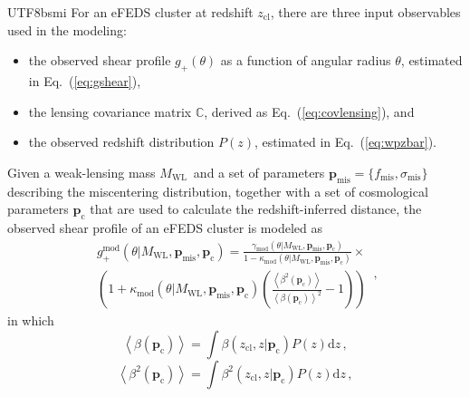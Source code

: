 \documentclass[longauth]{aa}
\newcommand{\redshift}{\ensuremath{z}}
\newcommand{\dif}{\ensuremath{\mathrm{d}}}
\newcommand{\zcl}{\ensuremath{z_{\mathrm{cl}}}}
\newcommand{\gshear}{\ensuremath{g_{+}}}
\newcommand{\Mwl}{\ensuremath{M_{\mathrm{WL}}}}
\newcommand{\lensingeff}{\ensuremath{\beta}}
\newcommand{\fmis}{\ensuremath{f_{\mathrm{mis}}}}
\newcommand{\sigmamis}{\ensuremath{{\sigma}_{\mathrm{mis}}}}
\begin{document}
\begin{CJK*}{UTF8}{bsmi}
For an eFEDS cluster at redshift \zcl, there are three input observables used in the modeling: 
%
\begin{itemize}
\item the observed shear profile ${\gshear}\left(\theta\right)$ as a function of angular radius $\theta$, estimated in Eq.~(\ref{eq:gshear}),
\item the lensing covariance matrix $\mathbb{C}$, derived as Eq.~(\ref{eq:covlensing}), and
\item the observed redshift distribution $P\left(\redshift\right)$, estimated in Eq.~(\ref{eq:wpzbar}).
\end{itemize}
%
Given a weak-lensing mass \Mwl\ and a set of parameters 
$\mathbf{p}_{\mathrm{mis}}=\{\fmis, \sigmamis\}$
describing the miscentering distribution, together with a set of cosmological parameters 
$\mathbf{p}_{\mathrm{c}}$
that are used to calculate the redshift-inferred distance, the observed shear profile of an eFEDS cluster is modeled as \citep{seitz97}
%
\begin{equation}
\label{eq:lensingmodel}
\begin{aligned}
g_{+}^{\mathrm{mod}}\left(
\theta |\Mwl, \mathbf{p}_{\mathrm{mis}}, \mathbf{p}_{\mathrm{c}}
\right) = 
\frac{
{\gamma}_{\mathrm{mod}}\left(
\theta |\Mwl, \mathbf{p}_{\mathrm{mis}}, \mathbf{p}_{\mathrm{c}}
\right)
}{
1 - {\kappa}_{\mathrm{mod}}\left(
\theta |\Mwl, \mathbf{p}_{\mathrm{mis}}, \mathbf{p}_{\mathrm{c}}
\right)
}\times
\\
\left(
1 + {\kappa}_{\mathrm{mod}}\left(
\theta |\Mwl, \mathbf{p}_{\mathrm{mis}}, \mathbf{p}_{\mathrm{c}}
\right)
\left(
\frac{
\left\langle
{\lensingeff}^2
\left(
\mathbf{p}_{\mathrm{c}}
\right)
\right\rangle
}{
\left\langle
\lensingeff
\left(
\mathbf{p}_{\mathrm{c}}
\right)
\right\rangle^2
}
-1
\right)
\right)
\end{aligned}
\, ,
\end{equation}
%
in which 
%
\begin{equation}
\label{eq:beta_over_pz}
\left\langle
\lensingeff
\left(
\mathbf{p}_{\mathrm{c}}
\right)
\right\rangle
 = 
\int
\lensingeff\left(\zcl,\redshift|\mathbf{p}_{\mathrm{c}}\right)
P
\left(\redshift\right)
\dif\redshift
\, ,
\end{equation}
%
%
\begin{equation}
\label{eq:beta2_over_pz}
\left\langle
{\lensingeff}^2
\left(
\mathbf{p}_{\mathrm{c}}
\right)
\right\rangle
 = 
\int
{\lensingeff}^2\left(\zcl,\redshift|\mathbf{p}_{\mathrm{c}}\right)
P
\left(\redshift\right)
\dif\redshift
\, ,
\end{equation}

\end{CJK*}
\end{document}
